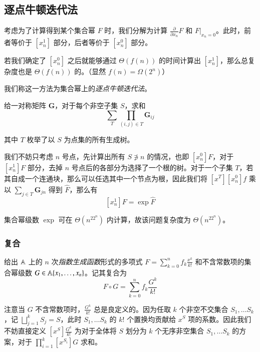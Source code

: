 \subsection{逐点牛顿迭代法}

考虑为了计算得到某个集合幂 $F$ 时，我们分解为计算 $\frac{\partial}{\partial x_n} F$ 和 $\left . F \right |_{x_n=0}$。此时，前者等价于 $[x_n^1]$ 部分，后者等价于 $[x_n^0]$ 部分。

若我们确定了 $[x_n^0]$ 之后就能够通过 $\Theta(f(n))$ 的时间计算出 $[x_n^1]$，那么总复杂度也是 $\Theta(f(n))$ 的。（显然 $f(n) = \Omega(2^n)$）

我们称这一方法为集合幂上的\emph{逐点牛顿迭代法}。

\begin{problem}[无根树计数]
给一对称矩阵 $\mathbf G$，对于每个非空子集 $S$，求和
$$
\sum_T \prod_{(i, j) \in T} \mathbf G_{ij}
$$

其中 $T$ 枚举了以 $S$ 为点集的所有生成树。
\end{problem}

\begin{solution}
我们不妨只考虑 $n$ 号点，先计算出所有 $S\not \ni n$ 的情况，也即 $[x_n^0]F$，对于 $[x_n^1]F$ 部分，去掉 $n$ 号点后的各部分为选择了一个根的树。对于一个子集 $T$，若其自成一个连通块，那么可以任选其中一个节点为根，因此我们将 $[x^T][x_n^0]f$ 乘以 $\sum_{j\in T} \mathbf G_{jn}$ 得到 $\widehat F$，那么有
$$
[x_n^1]F = \exp \widehat F
$$

集合幂级数 $\exp$ 可在 $\Theta(n^22^n)$ 内计算，故该问题复杂度为 $\Theta(n^22^n)$。
\end{solution}

\subsubsection{复合}

\begin{definition} [集合幂级数复合]
给出 $\mathbb A$ 上的 $n$ 次\emph{指数生成函数}形式的多项式 $F = \sum_{k=0}^n f_k \frac{x^k}{k!}$ 和不含常数项的集合幂级数 $G \in \mathbb A\{x_1, \dots, x_n\}$。记其复合为
$$
F\circ G = \sum_{k=0}^n f_k\frac{G^k}{k!}
$$

注意当 $G$ 不含常数项时，$\frac{G^k}{k!}$ 总是良定义的。因为任取 $k$ 个非空不交集合 $S_1,\dots S_k$，记 $\bigsqcup_{j=1}^k S_j = S$，此时 $S_1,\dots S_k$ 的 $k!$ 个置换均贡献给 $x^S$ 项的系数。因此我们不妨直接定义 $[x^S]\frac{G^k}{k!}$ 为对于全体将 $S$ 划分为 $k$ 个无序非空集合 $S_1,\dots S_k$ 的方案，对于 $\prod_{i=1}^k [x^{S_i}]G$ 求和。
\end{definition}

